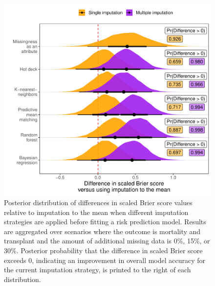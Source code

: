 \documentclass{article}
\begin{document}
\begin{figure}

{\centering \includegraphics{doc_arxiv_files/figure-latex/fig_md_strat_infer_ipa-1} 

}

\caption{Posterior distribution of differences in scaled Brier score values relative to imputation to the mean when different imputation strategies are applied before fitting a risk prediction model. Results are aggregated over scenarios where the outcome is mortality and transplant and the amount of additional missing data is 0\%, 15\%, or 30\%. Posterior probability that the difference in scaled Brier score exceeds 0, indicating an improvement in overall model accuracy for the current imputation strategy, is printed to the right of each distribution.}\label{fig:fig_md_strat_infer_ipa}
\end{figure}

\clearpage
\end{document}
